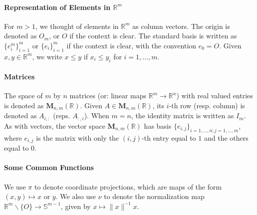 \paragraph{Representation of Elements in $\mathbb{R}^m$}For $m>1$, we thought of elements in $\mathbb{R}^m$ as column vectors. The origin is denoted as $O_m$, or $O$ if the context is clear. The standard basis is written as $\{e_i^m\}_{i=1}^m$ or $\{e_i\}_{i=1}^m$ if the context is clear, with the convention $e_0=O$. Given $x,y\in \mathbb{R}^m$, we write $x\leq y$ if $x_i\leq y_i$ for $i=1,\dotsc,m$.

\paragraph{Matrices}The space of $m$ by $n$ matrices (or: linear maps $\mathbb{R}^m\to \mathbb{R}^n$) with real valued entries is denoted as $\mathbf{M}_{n,m}(\mathbb{R})$. Given $A\in \mathbf{M}_{n,m}(\mathbb{R})$, its $i$-th row (resp. column) is denoted as $A_{i,:}$ (reps. $A_{:,i}$). When $m=n$, the identity matrix is written as $I_m$. As with vectors, the vector space $\mathbf{M}_{n,m}(\mathbb{R})$ has basis $\{e_{i,j}\}_{i=1,\dotsc,n; j=1,\dotsc, m}$, where $e_{i,j}$ is the matrix with only the $(i,j)$-th entry equal to $1$ and the others equal to $0$.

\paragraph{Some Common Functions}We use $\pi$ to denote coordinate projections, which are maps of the form $(x,y)\mapsto x$ or $y$. We also use $\nu$ to denote the normalization map $\mathbb{R}^{m}\smallsetminus \{O\}\to \mathbb{S}^{m-1}$, given by $x\mapsto \|x\|^{-1}x$.

